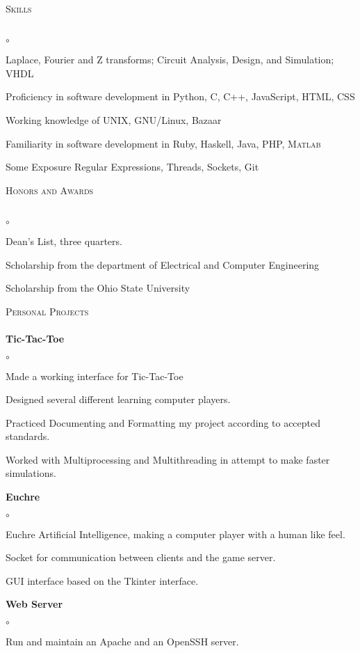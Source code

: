 \documentclass{article}
\newcommand{\lineunder}{\vspace*{-8pt} \\ \hspace*{-18pt} \hrulefill \\}
\newcommand{\header}[1]{{\hspace*{-15pt}\vspace*{6pt} \textsc{#1}} \vspace*{-6pt} \lineunder}
\newcommand{\project}[1]{{ \textbf{#1}  }}
\newenvironment{achievements}{\begin{list}{$\circ$}{\topsep 0pt \itemsep -2pt}}{\vspace*{4pt}\end{list}}
\begin{document}
\header{Skills}
\begin{achievements}
	\item Laplace, Fourier and Z transforms; Circuit Analysis, Design, and Simulation; VHDL
	\item Proficiency in software development in Python, C, C++, JavaScript, HTML, CSS
	\item Working knowledge of UNIX, GNU/Linux, Bazaar
	\item Familiarity in software development in Ruby, Haskell, Java, PHP, \textsc{Matlab}
	\item Some Exposure Regular Expressions, Threads, Sockets, Git
\end{achievements}

\header{Honors and Awards}
\begin{achievements}
	\item Dean's List, three quarters.
	\item Scholarship from the department of Electrical and Computer Engineering
	\item Scholarship from the Ohio State University
\end{achievements}

\header{Personal Projects}
\project{Tic-Tac-Toe}
	\begin{achievements}
	\item Made a working interface for Tic-Tac-Toe
	\item Designed several different learning computer players.
	\item Practiced Documenting and Formatting my project according to
	accepted standards.
	\item Worked with Multiprocessing and  Multithreading in attempt to
	make faster simulations.
	\end{achievements}

\project{Euchre}
	\begin{achievements}
	\item Euchre Artificial Intelligence, making a computer player with
a human like feel.
	\item Socket for communication between clients and the game server.
	\item GUI interface based on the Tkinter interface.
	\end{achievements}

\project{Web Server}
	\begin{achievements}
	\item Run and maintain an Apache and an OpenSSH server.
	\end{achievements}
\end{document}
